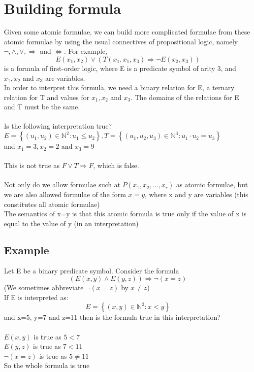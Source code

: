 \documentclass{article}[18pt]
\begin{document}
\section{Building formula}
Given some atomic formulae, we can build more complicated formulae from these atomic formulae by using the usual connectives of propositional logic, namely $\lnot,\land, \lor, \Rightarrow$ and $\Leftrightarrow$. For example,
$$E \left( x _ { 1 } , x _ { 2 } \right) \vee \left( T \left( x _ { 1 } , x _ { 1 } , x _ { 3 } \right) \Rightarrow \neg E \left( x _ { 2 } , x _ { 3 } \right) \right)$$
is a formula of first-order logic, where E is a predicate symbol of arity 3, and $x_1,x_2$ and $x_3$ are variables.\\
In order to interpret this formula, we need a binary relation for E, a ternary relation for T and values for $x_1,x_2$ and $x_3$. The domains of the relations for E and T must be the same.\\
\\
Is the following interpretation true?\\
$E = \left\{ \left( u _ { 1 } , u _ { 2 } \right) \in \mathbb { N } ^ { 2 } : u _ { 1 } \leq u _ { 2 } \right\} , T = \left\{ \left( u _ { 1 } , u _ { 2 } , u _ { 3 } \right) \in \mathbb { N } ^ { 3 } : u _ { 1 } \cdot u _ { 2 } = u _ { 3 } \right\}$\\
and $x_1=3,x_2=2$ and $x_3=9$\\
\\
This is not true as $F\lor T\Rightarrow F$, which is false.\\
\\
Not only do we allow formulae such at $P(x_1,x_2,...,x_r)$ as atomic formulae, but we are also allowed formulae of the form $x=y$, where x and y are variables (this constitutes all atomic formulae)\\
The semantics of x=y is that this atomic formula is true only if the value of x is equal to the value of y (in an interpretation)
\subsection{Example}
Let E be a binary predicate symbol. Consider the formula
$$( E ( x , y ) \wedge E ( y , z ) ) \Rightarrow \neg ( x = z )$$
(We sometimes abbreviate $\lnot(x=z)$ by $x\neq z$)\\
If E is interpreted as:
$$E = \left\{ ( x , y ) \in \mathbb { N } ^ { 2 } : x < y \right\}$$
and x=5, y=7 and z=11 then is the formula true in this interpretation?\\
\\
$E(x,y)$ is true as $5<7$\\
$E(y,z)$ is true as $7<11$\\
$\lnot(x=z)$ is true as $5\neq 11$\\
So the whole formula is true
\end{document}
